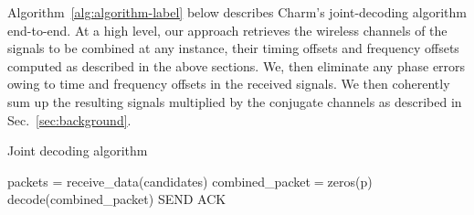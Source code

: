  \vspace*{0.1in}

 Algorithm~\ref{alg:algorithm-label} below describes Charm's joint-decoding algorithm end-to-end. At a high level, our approach retrieves the wireless channels of the signals to be combined at any instance, their timing offsets and frequency offsets computed as described in the above sections. We, then eliminate any phase errors owing to time and frequency offsets in the received signals. We then coherently sum up the resulting signals multiplied by the conjugate channels as described in Sec.~\ref{sec:background}. 




\LinesNumbered
\begin{algorithm}[ht]
\caption{Joint decoding algorithm}
\label{alg:algorithm-label}
 packets = receive\_data(candidates)\;
 combined\_packet$=$zeros(p)\;
 decode(combined\_packet)\;
 SEND ACK\;
 
 \end{algorithm}




